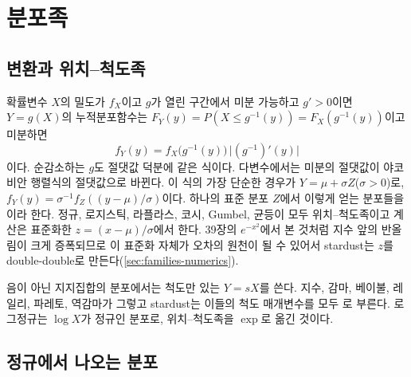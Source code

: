 \chapter{분포족}
\label{ch:distribution-families}


\section{변환과 위치--척도족}
\label{sec:transformations}

확률변수 $X$의 밀도가 $f_X$이고 $g$가 열린 구간에서 미분 가능하고 $g'>0$이면 $Y=g(X)$의 누적분포함수는 $F_Y(y)=P(X\le g^{-1}(y))=F_X(g^{-1}(y))$이고 미분하면
\[
f_Y(y)=f_X\bigl(g^{-1}(y)\bigr)\,\bigl|(g^{-1})'(y)\bigr|
\]
이다. 순감소하는 $g$도 절댓값 덕분에 같은 식이다. 다변수에서는 미분의 절댓값이 야코비안 행렬식의 절댓값으로 바뀐다. 이 식의 가장 단순한 경우가 $Y=\mu+\sigma Z$($\sigma>0$)로, $f_Y(y)=\sigma^{-1}f_Z((y-\mu)/\sigma)$이다. 하나의 표준 분포 $Z$에서 이렇게 얻는 분포들을 이라 한다. 정규, 로지스틱, 라플라스, 코시, Gumbel, 균등이 모두 위치--척도족이고 계산은 표준화한 $z=(x-\mu)/\sigma$에서 한다. 39장의 $e^{-x^2}$에서 본 것처럼 지수 앞의 반올림이 크게 증폭되므로 이 표준화 자체가 오차의 원천이 될 수 있어서 stardust는 $z$를 double-double로 만든다(\cref{sec:families-numerics}).

음이 아닌 지지집합의 분포에서는 척도만 있는  $Y=sX$를 쓴다. 지수, 감마, 베이불, 레일리, 파레토, 역감마가 그렇고 stardust는 이들의 척도 매개변수를 모두 로 부른다. 로그정규는 $\log X$가 정규인 분포로, 위치--척도족을 $\exp$로 옮긴 것이다.

\section{정규에서 나오는 분포}
\label{sec:normal-derived}

